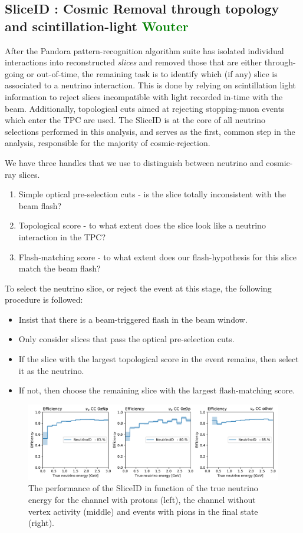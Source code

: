 \subsection{SliceID : Cosmic Removal through topology and scintillation-light \textcolor{green}{Wouter}}
\label{sec:sliceID:SliceID}
\par After the Pandora pattern-recognition algorithm suite has isolated individual interactions into reconstructed \emph{slices} and removed those that are either through-going or out-of-time, the remaining task is to identify which (if any) slice is associated to a neutrino interaction. This is done by relying on scintillation light information to reject slices incompatible with light recorded in-time with the beam. Additionally, topological cuts aimed at rejecting stopping-muon events which enter the TPC are used. The SliceID is at the core of all neutrino selections performed in this analysis, and serves as the first, common step in the analysis, responsible for the majority of cosmic-rejection.
\\
\par We have three handles that we use to distinguish between neutrino and cosmic-ray slices.
\begin{enumerate}
    \item Simple optical pre-selection cuts - is the slice totally inconsistent with the beam flash?
    \item Topological score - to what extent does the slice look like a neutrino interaction in the TPC?
    \item Flash-matching score - to what extent does our flash-hypothesis for this slice match the beam flash?
\end{enumerate}
To select the neutrino slice, or reject the event at this stage, the following procedure is followed:
\begin{itemize}
    \item Insist that there is a beam-triggered flash in the beam window.
    \item Only consider slices that pass the optical pre-selection cuts.
    \item If the slice with the largest topological score in the event remains, then select it as the neutrino.
    \item If not, then choose the remaining slice with the largest flash-matching score.
\end{itemize}
\begin{figure}
    \centering
    \includegraphics[width=\textwidth]{NuId-Ch2/Images/efficiency_cat_0.pdf}
    \caption{The performance of the SliceID in function of the true neutrino energy for the channel with protons (left), the channel without vertex activity (middle) and events with pions in the final state (right).}
    \label{fig:sliceid}
\end{figure}

